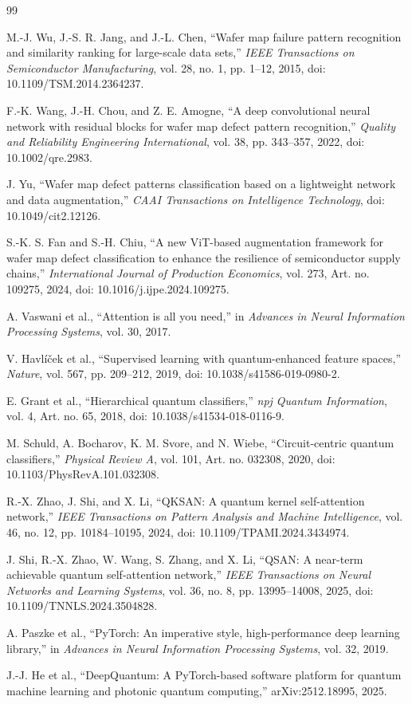 \documentclass[journal]{IEEEtran}
\begin{document}
\begin{thebibliography}{99}

M.-J. Wu, J.-S. R. Jang, and J.-L. Chen,
``Wafer map failure pattern recognition and similarity ranking for large-scale data sets,''
\emph{IEEE Transactions on Semiconductor Manufacturing}, vol. 28, no. 1, pp. 1--12, 2015, doi: 10.1109/TSM.2014.2364237.

F.-K. Wang, J.-H. Chou, and Z. E. Amogne,
``A deep convolutional neural network with residual blocks for wafer map defect pattern recognition,''
\emph{Quality and Reliability Engineering International}, vol. 38, pp. 343--357, 2022, doi: 10.1002/qre.2983.

J. Yu,
``Wafer map defect patterns classification based on a lightweight network and data augmentation,''
\emph{CAAI Transactions on Intelligence Technology}, doi: 10.1049/cit2.12126.

S.-K. S. Fan and S.-H. Chiu,
``A new ViT-based augmentation framework for wafer map defect classification to enhance the resilience of semiconductor supply chains,''
\emph{International Journal of Production Economics}, vol. 273, Art. no. 109275, 2024, doi: 10.1016/j.ijpe.2024.109275.

A. Vaswani et al.,
``Attention is all you need,''
in \emph{Advances in Neural Information Processing Systems}, vol. 30, 2017.

V. Havl\'{i}\v{c}ek et al.,
``Supervised learning with quantum-enhanced feature spaces,''
\emph{Nature}, vol. 567, pp. 209--212, 2019, doi: 10.1038/s41586-019-0980-2.

E. Grant et al.,
``Hierarchical quantum classifiers,''
\emph{npj Quantum Information}, vol. 4, Art. no. 65, 2018, doi: 10.1038/s41534-018-0116-9.

M. Schuld, A. Bocharov, K. M. Svore, and N. Wiebe,
``Circuit-centric quantum classifiers,''
\emph{Physical Review A}, vol. 101, Art. no. 032308, 2020, doi: 10.1103/PhysRevA.101.032308.

R.-X. Zhao, J. Shi, and X. Li,
``QKSAN: A quantum kernel self-attention network,''
\emph{IEEE Transactions on Pattern Analysis and Machine Intelligence}, vol. 46, no. 12, pp. 10184--10195, 2024, doi: 10.1109/TPAMI.2024.3434974.

J. Shi, R.-X. Zhao, W. Wang, S. Zhang, and X. Li,
``QSAN: A near-term achievable quantum self-attention network,''
\emph{IEEE Transactions on Neural Networks and Learning Systems}, vol. 36, no. 8, pp. 13995--14008, 2025, doi: 10.1109/TNNLS.2024.3504828.

A. Paszke et al.,
``PyTorch: An imperative style, high-performance deep learning library,''
in \emph{Advances in Neural Information Processing Systems}, vol. 32, 2019.

J.-J. He et al.,
``DeepQuantum: A PyTorch-based software platform for quantum machine learning and photonic quantum computing,''
arXiv:2512.18995, 2025.

\end{thebibliography}
\end{document}
